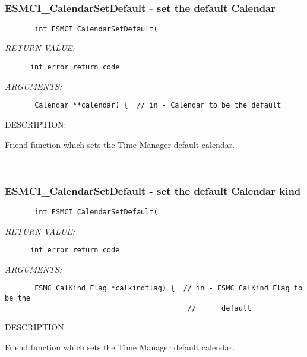  
\mbox{}\hrulefill\ 
 
\subsubsection [ESMCI\_CalendarSetDefault] {ESMCI\_CalendarSetDefault - set the default Calendar}


  
\begin{verbatim}       int ESMCI_CalendarSetDefault(\end{verbatim}{\em RETURN VALUE:}
\begin{verbatim}      int error return code\end{verbatim}{\em ARGUMENTS:}
\begin{verbatim}       Calendar **calendar) {  // in - Calendar to be the default\end{verbatim}
{\sf DESCRIPTION:\\ }


        Friend function which sets the Time Manager default calendar.
   
 
\mbox{}\hrulefill\ 
 
\subsubsection [ESMCI\_CalendarSetDefault] {ESMCI\_CalendarSetDefault - set the default Calendar kind}


  
\begin{verbatim}       int ESMCI_CalendarSetDefault(\end{verbatim}{\em RETURN VALUE:}
\begin{verbatim}      int error return code\end{verbatim}{\em ARGUMENTS:}
\begin{verbatim}       ESMC_CalKind_Flag *calkindflag) {  // in - ESMC_CalKind_Flag to be the
                                           //      default\end{verbatim}
{\sf DESCRIPTION:\\ }


        Friend function which sets the Time Manager default calendar.
   
 
